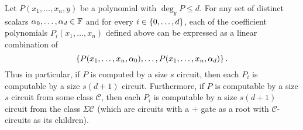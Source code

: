\begin{lemma}[Interpolation]\label{lem:interpolation}
Let $P(x_1,\ldots, x_n, y)$ be a polynomial with $\deg_y P \leq d$. For any set of distinct scalars $\alpha_0, \ldots, \alpha_{d} \in \mathbb{F}$ and for every $i \in \left\{0,\ldots, d\right\}$,  each of the coefficient polynomials $P_i(x_1,\ldots, x_n)$ defined above can be expressed as a linear combination of 
\[
\left\{P(x_1,\ldots, x_n, \alpha_0), \ldots, P(x_1,\ldots, x_n,\alpha_d)\right\}.
\]
Thus in particular, if $P$ is computed by a size $s$ circuit, then each $P_i$ is computable  by a size $s(d+1)$ circuit. Furthermore, if $P$ is computable by a size $s$ circuit from some class $\mathcal{C}$, then each $P_i$ is computable by a size $s(d+1)$ circuit from the class $\Sigma \mathcal{C}$ (which are circuits with a $+$ gate as a root with $\mathcal{C}$-circuits as its children).
\end{lemma}

